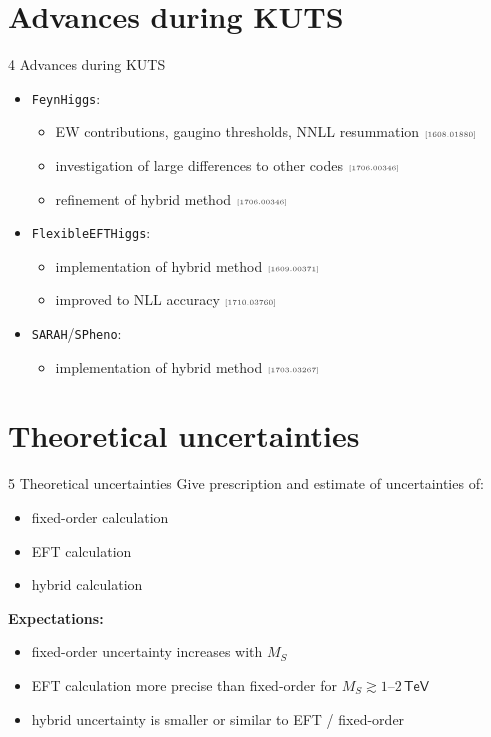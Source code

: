 \documentclass[hyperref={pdfpagelabels=false},ngerman]{beamer}
\newcommand{\eh}[1]{\,\mathsf{#1}}
\newcommand{\MS}{\ensuremath{M_S}}
\newcommand{\mycite}[1]{\ensuremath{\text{\textcolor{darkgray}{\tiny [#1]}}}}
\renewcommand{\emph}{\textbf}
\newcommand{\feft}{\texttt{FlexibleEFTHiggs}\xspace}
\newcommand{\FH}{\texttt{FeynHiggs}\xspace}
\newcommand{\SPheno}{\texttt{SPheno}\xspace}
\newcommand{\SARAH}{\texttt{SARAH}\xspace}
\begin{document}
\section{Advances during KUTS}

\begin{frame}{4 Advances during KUTS}
  \begin{itemize}
  \item \FH:
    \begin{itemize}
    \item EW contributions, gaugino thresholds, NNLL resummation \mycite{1608.01880}
    \item investigation of large differences to other codes \mycite{1706.00346}
    \item refinement of hybrid method \mycite{1706.00346}
  \end{itemize}
  \item \feft:
    \begin{itemize}
    \item implementation of hybrid method \mycite{1609.00371}
    \item improved to NLL accuracy \mycite{1710.03760}
  \end{itemize}
  \item \SARAH/\SPheno:
    \begin{itemize}
    \item implementation of hybrid method \mycite{1703.03267}
    \end{itemize}
  \end{itemize}
\end{frame}

\section{Theoretical uncertainties}

\begin{frame}{5 Theoretical uncertainties}
  Give prescription and estimate of uncertainties of:
  \begin{itemize}
  \item fixed-order calculation
  \item EFT calculation
  \item hybrid calculation
  \end{itemize}
  \vspace{1em}
  \emph{Expectations:}
  \begin{itemize}
  \item fixed-order uncertainty increases with $\MS$
  \item EFT calculation more precise than fixed-order for
    $\MS \gtrsim 1$--$2\eh{TeV}$
  \item hybrid uncertainty is smaller or similar to EFT / fixed-order
  \end{itemize}
\end{frame}
\end{document}
